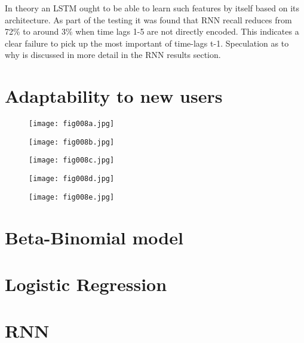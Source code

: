 In theory an LSTM ought to be able to learn such features by itself based on its architecture. As part of the testing it was found that RNN recall reduces from 72\% to around 3\% when time lags 1-5 are not directly encoded. This indicates a clear failure to pick up the most important of time-lags t-1. Speculation as to why is discussed in more detail in the RNN results section.

\section{Adaptability to new users}

\begin{figure}[h!]
	\centering
	\texttt{[image: fig008a.jpg]}
	\caption{}
	\label{fig:fig8a}
\end{figure} 

\begin{figure}[h!]
	\centering
	\texttt{[image: fig008b.jpg]}
	\caption{}
	\label{fig:fig8b}
\end{figure} 

\begin{figure}[h!]
	\centering
	\texttt{[image: fig008c.jpg]}
	\caption{}
	\label{fig:fig8c}
\end{figure} 

\begin{figure}[h!]
	\centering
	\texttt{[image: fig008d.jpg]}
	\caption{}
	\label{fig:fig8d}
\end{figure} 

\begin{figure}[h!]
	\centering
	\texttt{[image: fig008e.jpg]}
	\caption{}
	\label{fig:fig8e}
\end{figure} 

\section{Beta-Binomial model}

\section{Logistic Regression}

\section{RNN}

